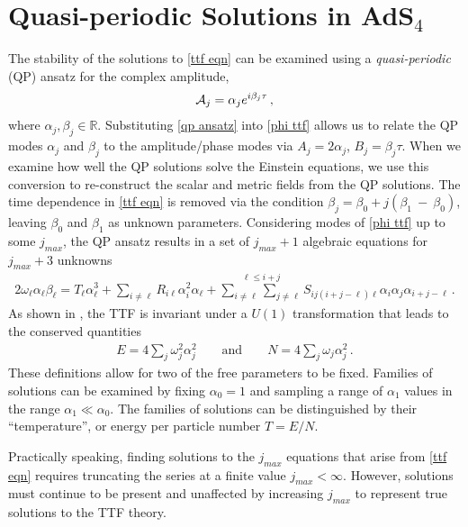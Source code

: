 \documentclass[../PhD.tex]{subfiles}
\begin{document}

\section{Quasi-periodic Solutions in AdS$_4$}
\label{sec: qp}

The stability of the solutions to \eqref{ttf eqn} can be examined using a \emph{quasi-periodic} (QP) ansatz for the complex amplitude,
\begin{align}
\label{qp ansatz}
\mathcal A_j = \alpha_j e^{i \beta_j \tau} \, ,
\end{align}
where $\alpha_j, \beta_j \in \mathbb{R}$. Substituting \eqref{qp ansatz} into \eqref{phi ttf} allows us to relate the QP modes $\alpha_j$ and $\beta_j$ to the amplitude/phase modes via $A_j = 2 \alpha_j$, $B_j = \beta_j \tau$. When we examine how well the QP solutions solve the Einstein equations, we use this conversion to re-construct the scalar and metric fields from the QP solutions. The time dependence in \eqref{ttf eqn} is removed via the condition $\beta_j = \beta_0 + j(\beta_1~-~\beta_0)$, leaving $\beta_0$ and $\beta_1$ as unknown parameters. Considering modes of \eqref{phi ttf} up to some $j_{max}$, the QP ansatz results in a set of $j_{max} + 1$ algebraic equations for $j_{max} + 3$ unknowns
\begin{align}
\label{qp eqn}
2 \omega_\ell \alpha_\ell \beta_\ell = T_\ell \alpha_\ell^3 + \sum_{i \neq \ell} R_{i\ell} \alpha_i^2 \alpha_\ell + \stackrel{\ell \leq i + j}{\sum_{i \neq \ell} \sum_{j \neq \ell}} S_{ij(i+j-\ell)\ell} \alpha_i \alpha_j \alpha_{i+j-\ell} \, .
\end{align}
As shown in \cite{1507.08261, 1510.07836}, the TTF is invariant under a $U(1)$ transformation that leads to the conserved quantities
\begin{align}
\label{qp cons}
E = 4\sum_j \omega^2_j \alpha_j^2 \qquad \text{and} \qquad N= 4 \sum_j \omega_j \alpha_j^2 \, .
\end{align}
These definitions allow for two of the free parameters to be fixed. Families of solutions can be examined by fixing $\alpha_0 = 1$ and sampling a range of $\alpha_1$ values in the range $\alpha_1 \ll \alpha_0$. The families of solutions can be distinguished by their ``temperature'', or energy per particle number $T=E/N$. 

Practically speaking, finding solutions to the $j_{max}$ equations that arise from \eqref{ttf eqn} requires truncating the series at a finite value $j_{max} < \infty$. However, solutions must continue to be present and unaffected by increasing $j_{max}$ to represent true solutions to the TTF theory. 
\end{document}
